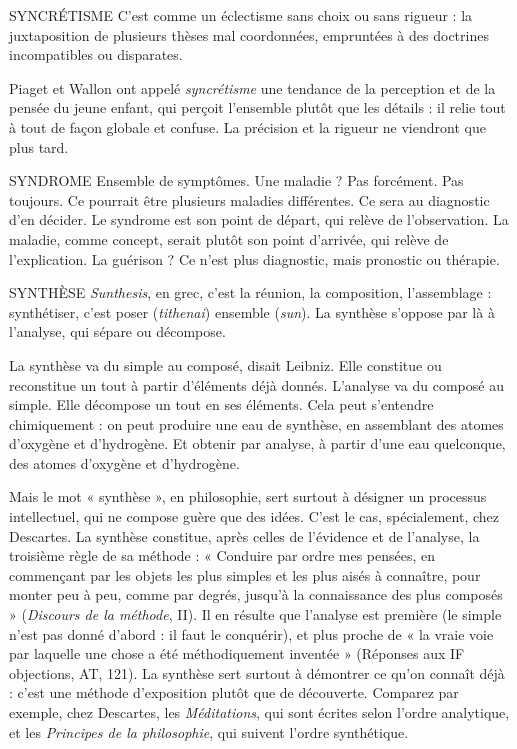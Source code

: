 SYNCRÉTISME C’est comme un éclectisme sans choix ou sans rigueur : la
juxtaposition de plusieurs thèses mal coordonnées, empruntées
à des doctrines incompatibles ou disparates.

Piaget et Wallon ont appelé {\it syncrétisme} une tendance de la perception et de
la pensée du jeune enfant, qui perçoit l’ensemble plutôt que les détails : il relie
tout à tout de façon globale et confuse. La précision et la rigueur ne viendront
que plus tard.

SYNDROME Ensemble de symptômes. Une maladie ? Pas forcément. Pas toujours.
Ce pourrait être plusieurs maladies différentes. Ce sera
au diagnostic d’en décider. Le syndrome est son point de départ, qui relève de
l'observation. La maladie, comme concept, serait plutôt son point d’arrivée,
qui relève de l'explication. La guérison ? Ce n’est plus diagnostic, mais pronostic
ou thérapie.

SYNTHÈSE {\it Sunthesis}, en grec, c’est la réunion, la composition, l’assemblage :
synthétiser, c’est poser ({\it tithenai}) ensemble ({\it sun}). La synthèse
s’oppose par là à l'analyse, qui sépare ou décompose.

La synthèse va du simple au composé, disait Leibniz. Elle constitue ou
reconstitue un tout à partir d'éléments déjà donnés. L'analyse va du composé
au simple. Elle décompose un tout en ses éléments. Cela peut s'entendre
chimiquement : on peut produire une eau de synthèse, en assemblant des
atomes d’oxygène et d'hydrogène. Et obtenir par analyse, à partir d’une eau
quelconque, des atomes d'oxygène et d'hydrogène.

Mais le mot « synthèse », en philosophie, sert surtout à désigner un processus
intellectuel, qui ne compose guère que des idées. C’est le cas, spécialement,
chez Descartes. La synthèse constitue, après celles de l'évidence et de
l'analyse, la troisième règle de sa méthode : « Conduire par ordre mes pensées,
en commençant par les objets les plus simples et les plus aisés à connaître, pour
monter peu à peu, comme par degrés, jusqu'à la connaissance des plus
composés » ({\it Discours de la méthode}, II). Il en résulte que l’analyse est première
(le simple n’est pas donné d’abord : il faut le conquérir), et plus proche de « la
vraie voie par laquelle une chose a été méthodiquement inventée » (Réponses
aux IF objections, AT, 121). La synthèse sert surtout à démontrer ce qu’on
connaît déjà : c’est une méthode d’exposition plutôt que de découverte. Comparez
par exemple, chez Descartes, les {\it Méditations}, qui sont écrites selon l’ordre
analytique, et les {\it Principes de la philosophie}, qui suivent l’ordre synthétique.

